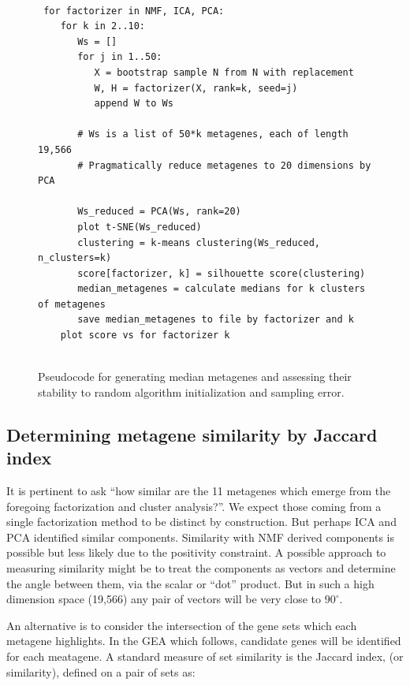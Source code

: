 \documentclass[tikz, 12pt,a4paper,oneside,fleqn]{article}
\begin{document}
\begin{figure}[htb!]
\begin{center}
\begin{Verbatim}[baselinestretch=1, frame=single, rulecolor=\color{blue}, label=Metagene Stability Assessment, fontfamily=courier, fontsize=\small]

 for factorizer in NMF, ICA, PCA:
    for k in 2..10:
       Ws = []
       for j in 1..50:
          X = bootstrap sample N from N with replacement
          W, H = factorizer(X, rank=k, seed=j)
          append W to Ws
   	     
       # Ws is a list of 50*k metagenes, each of length 19,566
       # Pragmatically reduce metagenes to 20 dimensions by PCA
   	  
       Ws_reduced = PCA(Ws, rank=20)
       plot t-SNE(Ws_reduced)
       clustering = k-means clustering(Ws_reduced, n_clusters=k)
       score[factorizer, k] = silhouette score(clustering)	  
       median_metagenes = calculate medians for k clusters of metagenes
       save median_metagenes to file by factorizer and k
    plot score vs for factorizer k
      
\end{Verbatim}
\end{center}
\caption{Pseudocode for generating median metagenes and assessing their stability to random algorithm initialization and sampling error.}
\label{fig-clustering-psuedocode}
\end{figure}

\subsection{Determining metagene similarity by Jaccard index}

It is pertinent to ask ``how similar are the 11 metagenes which emerge from the foregoing factorization and cluster analysis?''.  We expect those coming from a single factorization method to be distinct by construction.  But perhaps ICA and PCA identified similar components.  Similarity with NMF derived components is possible but less likely due to the positivity constraint.  A possible approach to measuring similarity might be to treat the components as vectors and determine the angle between them, via the scalar or ``dot'' product.  But in such a high dimension space (19,566) any pair of vectors will be very close to $90^\circ$.

An alternative is to consider the intersection of the gene sets which each metagene highlights.  In the GEA which follows, candidate genes will be identified for each meatagene.  A standard measure of set similarity is the Jaccard index, (or similarity), defined on a pair of sets as:
\end{document}
